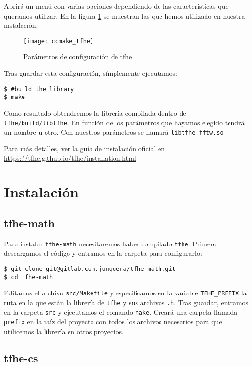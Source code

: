 Abrirá un menú con varias opciones dependiendo de las características que queramos utilizar. En la figura \ref{fig:ccmake_tfhe} se muestran las que hemos utilizado en nuestra instalación.

\begin{figure}[h]
    \texttt{[image: ccmake\_tfhe]}
    \caption{Parámetros de configuración de tfhe}
    \label{fig:ccmake_tfhe}
\end{figure}

Tras guardar esta configuración, símplemente ejecutamos:

\begin{verbatim}
$ #build the library
$ make
\end{verbatim}

Como resultado obtendremos la librería compilada dentro de \verb|tfhe/build/libtfhe|. En función de los parámetros que hayamos elegido tendrá un nombre u otro. Con nuestros parámetros se llamará \verb|libtfhe-fftw.so|

Para más detalles, ver la guía de instalación oficial en \url{https://tfhe.github.io/tfhe/installation.html}.

\section{Instalación}

\subsection{tfhe-math}

Para instalar \verb|tfhe-math| necesitaremos haber compilado \verb|tfhe|. Primero descargamos el código y entramos en la carpeta para configurarlo:

\begin{verbatim}
$ git clone git@gitlab.com:junquera/tfhe-math.git
$ cd tfhe-math
\end{verbatim}

Editamos el archivo \verb|src/Makefile| y especificamos en la variable \verb|TFHE_PREFIX| la ruta en la que están la librería de \verb|tfhe| y sus archivos \verb|.h|. Tras guardar, entramos en la carpeta \verb|src| y ejecutamos el comando \verb|make|. Creará una carpeta llamada \verb|prefix| en la raíz del proyecto con todos los archivos necesarios para que utilicemos la librería en otros proyectos.

\subsection{tfhe-cs}

